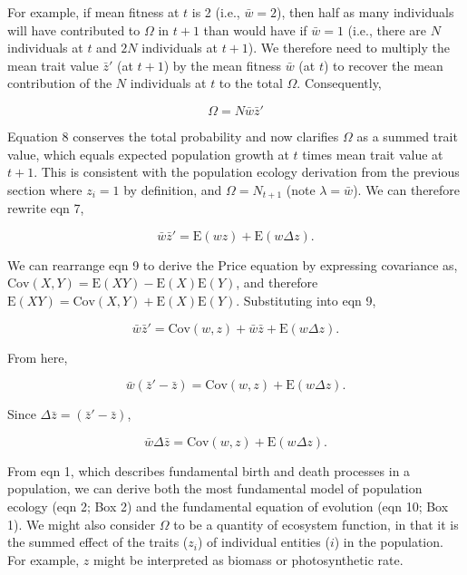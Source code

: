 \documentclass[
]{article}
\begin{document}
For example, if mean fitness at \(t\) is 2 (i.e., \(\bar{w} = 2\)), then
half as many individuals will have contributed to \(\Omega\) in
\(t + 1\) than would have if \(\bar{w} = 1\) (i.e., there are \(N\)
individuals at \(t\) and \(2N\) individuals at \(t + 1\)). We therefore
need to multiply the mean trait value \(\bar{z}'\) (at \(t + 1\)) by the
mean fitness \(\bar{w}\) (at \(t\)) to recover the mean contribution of
the \(N\) individuals at \(t\) to the total \(\Omega\). Consequently,

\[\Omega = N\bar{w}\bar{z}'
\tag{8}
\]

Equation 8 conserves the total probability and now clarifies \(\Omega\)
as a summed trait value, which equals expected population growth at
\(t\) times mean trait value at \(t + 1\). This is consistent with the
population ecology derivation from the previous section where
\(z_{i} = 1\) by definition, and \(\Omega = N_{t+1}\) (note
\(\lambda = \bar{w}\)). We can therefore rewrite eqn 7,

\[\bar{w}\bar{z}' = \mathrm{E}\left(w z \right) + \mathrm{E}\left( w \Delta z  \right).
\tag{9}
\]

We can rearrange eqn 9 to derive the Price equation by expressing
covariance as,
\(\mathrm{Cov}(X,Y) = \mathrm{E}(XY) - \mathrm{E}(X)\mathrm{E}(Y)\), and
therefore
\(\mathrm{E}(XY) = \mathrm{Cov}(X,Y) + \mathrm{E}(X)\mathrm{E}(Y)\).
Substituting into eqn 9,

\[\bar{w}\bar{z}' = \mathrm{Cov}\left(w ,z \right) + \bar{w}\bar{z} + \mathrm{E}\left( w \Delta z  \right).\]

From here,

\[\bar{w}\left(\bar{z}' - \bar{z}\right) = \mathrm{Cov}\left(w ,z \right) + \mathrm{E}\left( w \Delta z  \right).\]

Since \(\Delta \bar{z} = \left(\bar{z}' - \bar{z}\right)\),

\[\bar{w}\Delta \bar{z} = \mathrm{Cov}\left(w ,z \right) + \mathrm{E}\left( w \Delta z  \right).
\tag{10}
\]

From eqn 1, which describes fundamental birth and death processes in a
population, we can derive both the most fundamental model of population
ecology (eqn 2; Box 2) and the fundamental equation of evolution (eqn
10; Box 1). We might also consider \(\Omega\) to be a quantity of
ecosystem function, in that it is the summed effect of the traits
(\(z_{i}\)) of individual entities (\(i\)) in the population. For
example, \(z\) might be interpreted as biomass or photosynthetic rate.
\end{document}
